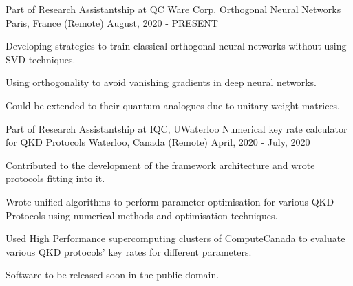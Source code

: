 

\begin{cventries}

  \cventry
    {Part of Research Assistantship  at QC Ware Corp.} %
    {Orthogonal Neural Networks} %
    {Paris, France (Remote)} %
    {August, 2020 - PRESENT} %
    {
      \begin{cvitems} %
        \item {Developing strategies to train classical orthogonal neural networks without using SVD techniques.}
        \item {Using orthogonality to avoid vanishing gradients in deep neural networks.}
        \item {Could be extended to their quantum analogues due to unitary weight matrices.}
      \end{cvitems}
    }


  \cventry
    {Part of Research Assistantship at IQC, UWaterloo} %
    {Numerical key rate calculator for QKD Protocols} %
    {Waterloo, Canada (Remote)} %
    {April, 2020 - July, 2020} %
    {
      \begin{cvitems} %
        \item {Contributed to the development of the framework architecture and wrote protocols fitting into it.}
        \item {Wrote unified algorithms to perform parameter optimisation for various QKD Protocols using numerical methods and optimisation techniques.}
        \item {Used High Performance supercomputing clusters of ComputeCanada to evaluate various QKD protocols' key rates for different parameters.}
        \item {Software to be released soon in the public domain.}
      \end{cvitems}
    }
    

\end{cventries}
